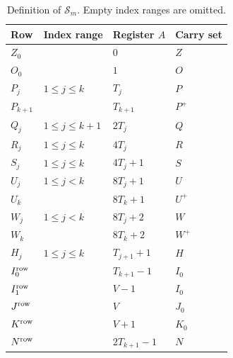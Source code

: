 \documentclass[11pt]{article}
\theoremstyle{remark}
\newcommand{\Sc}{\mathcal S}
\begin{document}
\begin{table}[htbp]
\centering\small
\caption{Definition of $\Sc_m$. Empty index ranges are omitted.}
\label{family:tab:states}
\begin{tabular}{llll}
\toprule
Row & Index range & Register $A$ & Carry set\\
\midrule
$Z_0$ & & $0$ & $Z$\\
$O_0$ & & $1$ & $O$\\
$P_j$ & $1\le j\le k$ & $T_j$ & $P$\\
$P_{k+1}$ & & $T_{k+1}$ & $P^+$\\
$Q_j$ & $1\le j\le k+1$ & $2T_j$ & $Q$\\
$R_j$ & $1\le j\le k$ & $4T_j$ & $R$\\
$S_j$ & $1\le j\le k$ & $4T_j+1$ & $S$\\
$U_j$ & $1\le j<k$ & $8T_j+1$ & $U$\\
$U_k$ & & $8T_k+1$ & $U^+$\\
$W_j$ & $1\le j<k$ & $8T_j+2$ & $W$\\
$W_k$ & & $8T_k+2$ & $W^+$\\
$H_j$ & $1\le j\le k$ & $T_{j+1}+1$ & $H$\\
$I_0^{\rm row}$ & & $T_{k+1}-1$ & $I_0$\\
$I_1^{\rm row}$ & & $V-1$ & $I_0$\\
$J^{\rm row}$ & & $V$ & $J_0$\\
$K^{\rm row}$ & & $V+1$ & $K_0$\\
$N^{\rm row}$ & & $2T_{k+1}-1$ & $N$\\
\bottomrule
\end{tabular}
\end{table}
\end{document}
